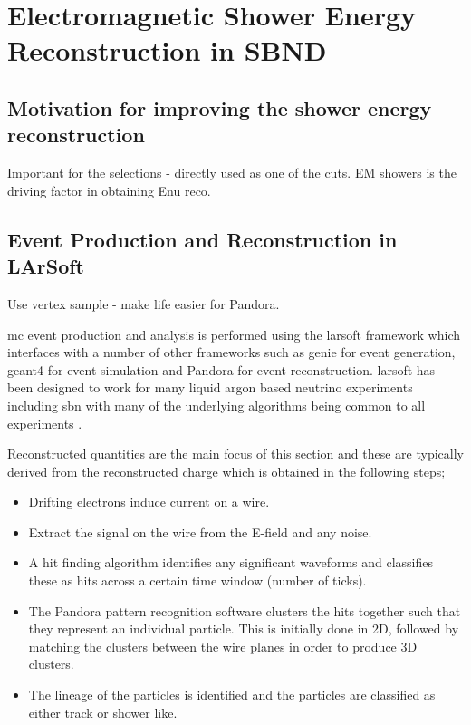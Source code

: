 \chapter{Electromagnetic Shower Energy Reconstruction in SBND}
\label{chap:Energy_Reco}
\section{Motivation for improving the shower energy reconstruction}

Important for the selections - directly used as one of the cuts. 
EM showers is the driving factor in obtaining Enu reco.


\section{Event Production and Reconstruction in LArSoft}

Use vertex sample - make life easier for Pandora.

\gls{mc} event production and analysis is performed using the \gls{larsoft} framework which interfaces with a number of other frameworks such as \gls{genie} for event generation, \gls{geant4} for event simulation and Pandora for event reconstruction. \gls{larsoft} has been designed to work for many liquid argon based neutrino experiments including \gls{sbn} with many of the underlying algorithms being common to all experiments \cite{larsoft}\cite{larsoft_paper}.

Reconstructed quantities are the main focus of this section and these are typically derived from the reconstructed charge which is obtained in the following steps;
\begin{itemize}
    \item Drifting electrons induce current on a wire.
    \item Extract the signal on the wire from the E-field and any noise. 
    \item A hit finding algorithm identifies any significant waveforms and classifies these as hits across a certain time window (number of ticks). 
    \item The Pandora pattern recognition software clusters the hits together such that they represent an individual particle. This is initially done in 2D, followed by matching the clusters between the wire planes in order to produce 3D clusters.
    \item The lineage of the particles is identified and the particles are classified as either track or shower like.
\end{itemize}

